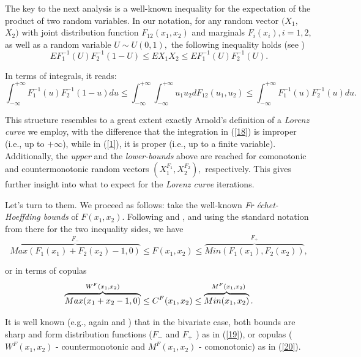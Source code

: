 \documentclass[onecolumn]{article}
\providecommand{\dint}{\displaystyle\int}
\renewcommand{\dint}{\displaystyle\int}
\begin{document}
The key to the next analysis is a well-known inequality for the expectation
of the product of two random variables. In our notation, for any random
vector $(X_{1},$ $X_{2})$ with joint distribution function $%
F_{12}(x_{1},x_{2})$ and marginals $F_{i}(x_{i}),i=1,2$, as well as a random
variable $U\sim U(0,1),$ the following inequality holds (see \cite{[5]})%
\begin{equation}
EF_{1}^{-1}(U)F_{2}^{-1}(1-U)\leq EX_{1}X_{2}\leq
EF_{1}^{-1}(U)F_{2}^{-1}(U).  \label{17}
\end{equation}

In terms of integrals, it reads: 
\begin{equation}
\dint\nolimits_{-\infty }^{+\infty }F_{1}^{-1}(u)F_{2}^{-1}(1-u)du\leq
\dint\nolimits_{-\infty }^{+\infty }\dint\nolimits_{-\infty }^{+\infty
}u_{1}u_{2}dF_{12}(u_{1},u_{2})\leq \dint\nolimits_{-\infty }^{+\infty
}F_{1}^{-1}(u)F_{2}^{-1}(u)du.  \label{18}
\end{equation}

This structure resembles to a great extent exactly Arnold's definition of a 
\textit{Lorenz curve} we employ, with the difference that the integration in
(\ref{18}) is improper (i.e., up to $+\infty $), while in (\ref{1}), it is
proper (i.e., up to a finite variable). Additionally, the \textit{upper} and
the \textit{lower-bounds} above are reached for comonotonic and
countermonotonic random vectors $(X_{1}^{F_{1}},X_{2}^{F_{2}}),$
respectively. This gives further insight into what to expect for the \textit{%
Lorenz curve} iterations.

Let's turn to them. We proceed as follows: take the well-known \textit{Fr%
\'{e}chet-Hoeffding bounds} of $F(x_{1},x_{2})$. Following \cite{[5]} and 
\cite{[11]}, and using the standard notation from there for the two
inequality sides, we have%
\begin{equation}
\overset{F_{-}}{\overbrace{Max(F_{1}(x_{1})+F_{2}(x_{2})-1,0)}}\leq
F(x_{1},x_{2})\leq \overset{F_{+}}{\overbrace{Min(F_{1}(x_{1}),F_{2}(x_{2}))}%
},  \label{19}
\end{equation}

or in terms of copulas%
\begin{equation}
\overset{W^{F}(x_{1},x_{2})}{\overbrace{Max(x_{1}+x_{2}-1,0)}}\leq
C^{F}(x_{1},x_{2})\leq \overset{M^{F}(x_{1},x_{2})}{\overbrace{%
Min(x_{1},x_{2})}.}  \label{20}
\end{equation}

It is well known (e.g., again \cite{[5]} and \cite{[11]}) that in the
bivariate case, both bounds are sharp and form distribution functions ($%
F_{-} $ and $F_{+}$ ) as in (\ref{19}), or copulas ($W^{F}(x_{1},x_{2})$ -
countermonotonic and $M^{F}(x_{1},x_{2})$ - comonotonic) as in (\ref{20}).
\end{document}
